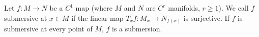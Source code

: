 Let $f: M \to N$ be a $C^1$ map (where $M$ and $N$ are $C^r$ manifolds, $r \geqslant 1$). We call $f$ submersive at $x \in M$ if the linear map $T_x f: M_x \to N_{f(x)}$ is surjective. If $f$ is submersive at every point of $M$, $f$ is a submersion.
